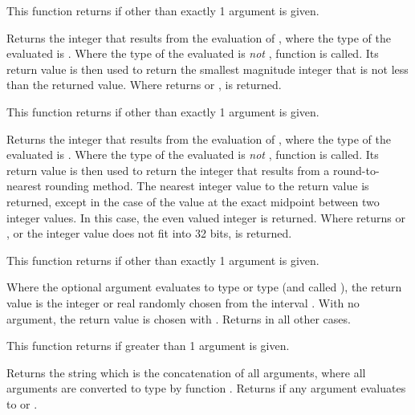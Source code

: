\begin{description}
    This function returns  if other than exactly 1
    argument is given.

  \item[\Code{Integer ceiling(AnyType Expr)}]
    Returns the integer that results from the evaluation of ,
    where the type of the evaluated  is .
    Where the type of the evaluated  is \emph{not} ,
    function  is called.
    Its return value is then used to return the smallest magnitude
    integer that is not less than the returned value. 
    Where  returns  or ,
     is returned.

    This function returns  if other than exactly 1
    argument is given.

  \item[\Code{Integer round(AnyType Expr)}]
    Returns the integer that results from the evaluation of ,
    where the type of the evaluated  is .
    Where the type of the evaluated  is \emph{not} ,
    function  is called.
    Its return value is then used to return the 
    integer that results from a round-to-nearest rounding method. 
    The nearest integer value to the return value is returned,
    except in the case of the value at the exact midpoint between
    two integer values.  
    In this case, the even valued integer is returned.
    Where  returns  or ,
    or the integer value does not fit into 32 bits,
     is returned.

    This function returns  if other than exactly 1
    argument is given.

  \item[\Code{Integer random(\Lbr\ AnyType Expr \Rbr)}]
    Where the optional argument  evaluates to type 
    or type 
    (and called ),
    the return value is the integer or real  randomly chosen
    from the interval .
    With no argument, the return value is chosen with .
    Returns  in all other cases.

    This function returns  if greater than 1
    argument is given.

  \item[\Code{String strcat(AnyType Expr1 \Lbr\ , AnyType Expr2 \Dots \Rbr)}]
    Returns the string which is the concatenation of all arguments, where all arguments are 
    converted to type  by function .
    Returns  if any argument evaluates to  or .


\end{description}
